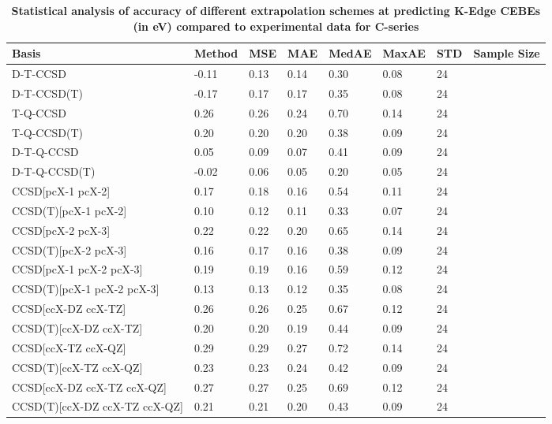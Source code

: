 \begin{table}
  \caption{\textbf{Statistical analysis of accuracy of different extrapolation schemes at predicting K-Edge CEBEs (in eV) compared to experimental data for C-series}}
  \label{tbl:extrap-scheme-summary-c}
  \begin{tabular}{l l l l l l l l }
    \toprule
    \textbf{Basis} & \textbf{Method} & \textbf{MSE} & \textbf{MAE} & \textbf{MedAE} & \textbf{MaxAE} & \textbf{STD} & \textbf{Sample Size} \\ 
    \midrule
    D-T-CCSD & -0.11 & 0.13 & 0.14 & 0.30 & 0.08 & 24 \\ 
    D-T-CCSD(T) & -0.17 & 0.17 & 0.17 & 0.35 & 0.08 & 24 \\ 
    T-Q-CCSD & 0.26 & 0.26 & 0.24 & 0.70 & 0.14 & 24 \\ 
    T-Q-CCSD(T) & 0.20 & 0.20 & 0.20 & 0.38 & 0.09 & 24 \\ 
    D-T-Q-CCSD & 0.05 & 0.09 & 0.07 & 0.41 & 0.09 & 24 \\ 
    D-T-Q-CCSD(T) & -0.02 & 0.06 & 0.05 & 0.20 & 0.05 & 24 \\ 
    CCSD[pcX-1 pcX-2] & 0.17 & 0.18 & 0.16 & 0.54 & 0.11 & 24 \\ 
    CCSD(T)[pcX-1 pcX-2] & 0.10 & 0.12 & 0.11 & 0.33 & 0.07 & 24 \\ 
    CCSD[pcX-2 pcX-3] & 0.22 & 0.22 & 0.20 & 0.65 & 0.14 & 24 \\ 
    CCSD(T)[pcX-2 pcX-3] & 0.16 & 0.17 & 0.16 & 0.38 & 0.09 & 24 \\ 
    CCSD[pcX-1 pcX-2 pcX-3] & 0.19 & 0.19 & 0.16 & 0.59 & 0.12 & 24 \\ 
    CCSD(T)[pcX-1 pcX-2 pcX-3] & 0.13 & 0.13 & 0.12 & 0.35 & 0.08 & 24 \\ 
    CCSD[ccX-DZ ccX-TZ] & 0.26 & 0.26 & 0.25 & 0.67 & 0.12 & 24 \\ 
    CCSD(T)[ccX-DZ ccX-TZ] & 0.20 & 0.20 & 0.19 & 0.44 & 0.09 & 24 \\ 
    CCSD[ccX-TZ ccX-QZ] & 0.29 & 0.29 & 0.27 & 0.72 & 0.14 & 24 \\ 
    CCSD(T)[ccX-TZ ccX-QZ] & 0.23 & 0.23 & 0.24 & 0.42 & 0.09 & 24 \\ 
    CCSD[ccX-DZ ccX-TZ ccX-QZ] & 0.27 & 0.27 & 0.25 & 0.69 & 0.12 & 24 \\ 
    CCSD(T)[ccX-DZ ccX-TZ ccX-QZ] & 0.21 & 0.21 & 0.20 & 0.43 & 0.09 & 24 \\ 
    \bottomrule
  \end{tabular}
\end{table}
